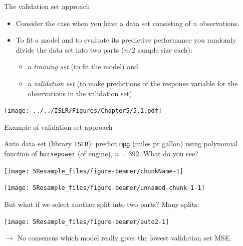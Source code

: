 \documentclass[
  10pt,
  ignorenonframetext,
]{beamer}
\providecommand{\tightlist}{%
  \setlength{\itemsep}{0pt}\setlength{\parskip}{0pt}}
\begin{document}
\begin{frame}
\begin{block}{The validation set approach}
\protect\hypertarget{the-validation-set-approach}{}
\vspace{2mm}

\begin{itemize}
\item
  Consider the case when you have a data set consisting of \(n\)
  observations.
\item
  To fit a model and to evaluate its predictive performance you randomly
  divide the data set into two parts (\(n/2\) sample size each):

  \begin{itemize}
  \tightlist
  \item
    a \emph{training set} (to fit the model) and
  \item
    a \emph{validation set} (to make predictions of the response
    variable for the observations in the validation set)
  \end{itemize}
\end{itemize}

\vspace{4mm}

\texttt{[image: ../../ISLR/Figures/Chapter5/5.1.pdf]}
\end{block}
\end{frame}

\begin{frame}[fragile]
\begin{block}{Example of validation set approach}
\protect\hypertarget{example-of-validation-set-approach}{}
\vspace{2mm}

Auto data set (library \texttt{ISLR}): predict \texttt{mpg} (miles pr
gallon) using polynomial function of \texttt{horsepower} (of engine),
\(n=392\). What do you see?

\begin{center}\texttt{[image: 5Resample\_files/figure-beamer/chunkName-1]} \end{center}
\end{block}
\end{frame}

\begin{frame}
\texttt{[image: 5Resample\_files/figure-beamer/unnamed-chunk-1-1]}
\end{frame}

\begin{frame}
But what if we select another split into two parts? Many splits:

\begin{center}\texttt{[image: 5Resample\_files/figure-beamer/auto2-1]} \end{center}

\vspace{2mm}

\(\rightarrow\) No consensus which model really gives the lowest
validation set MSE.
\end{frame}
\end{document}
